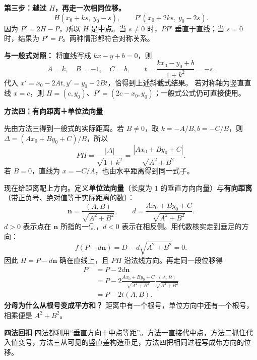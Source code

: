 \begin{proofbox}
\textbf{第三步：越过 $H$，再走一次相同位移。}
\[
 \boxed{H(x_0+ks,\ y_0-s)},\qquad
 \boxed{P'(x_0+2ks,\ y_0-2s)}.
\]
因为 $P'=2H-P$，所以 $H$ 是中点。当 $s\ne0$ 时，$PP'$ 垂直于直线；当 $s=0$ 时，结果为 $P'=P$。两种情形都符合对称关系。

\textbf{与一般式对照：} 将直线写成 $kx-y+b=0$，则
\[
 A=k,\quad B=-1,\quad C=b,\qquad
 t=\frac{kx_0-y_0+b}{1+k^2}=-s.
\]
代入 $x'=x_0-2At,y'=y_0-2Bt$，恰得到上述斜截式结果。
若对称轴为竖直直线 $x=c$，则 $H=(c,y_0)$、$P'=(2c-x_0,y_0)$；一般式公式仍可直接使用。

\medskip
\begin{minipage}{\linewidth}
\textbf{\textcolor{CProof}{方法四：有向距离＋单位法向量}}

\end{minipage}

先由方法三得到一般式的实际距离。若 $B\ne0$，取
$k=-A/B,b=-C/B$，则 $\Delta=(Ax_0+By_0+C)/B$，所以
\[
 PH=\frac{|\Delta|}{\sqrt{1+k^2}}
 =\frac{|Ax_0+By_0+C|}{\sqrt{A^2+B^2}}.
\]
若 $B=0$，直线为 $x=-C/A$，也由水平距离得到同一式子。

现在给距离配上方向。定义\textbf{单位法向量}（长度为 $1$ 的垂直方向向量）与\textbf{有向距离}（带正负号、绝对值等于实际距离的数）：
\[
 \mathbf n=\frac{(A,B)}{\sqrt{A^2+B^2}},
 \qquad d=\frac{Ax_0+By_0+C}{\sqrt{A^2+B^2}}.
\]
$d>0$ 表示点在 $\mathbf n$ 所指的一侧，$d<0$ 表示在相反侧。用代数核实走到垂足的方向：
\[
 f(P-d\mathbf n)
 =D-d\sqrt{A^2+B^2}=0.
\]
因此 $H=P-d\mathbf n$ 确在直线上，且 $PH$ 沿法线方向。再走同一段位移得
\[
 \begin{aligned}
 P'&=P-2d\mathbf n\\
 &=P-2\frac{Ax_0+By_0+C}{\sqrt{A^2+B^2}}
       \frac{(A,B)}{\sqrt{A^2+B^2}}\\
 &=P-2t(A,B).
 \end{aligned}
\]
\textbf{分母为什么从根号变成平方和？} 距离中有一个根号，单位方向中还有一个根号，相乘便是 $A^2+B^2$。

\medskip
\textbf{\textcolor{CProof}{四法回扣}}
四法都利用“垂直方向＋中点等距”。方法一直接代中点，方法二抓住代入值变号，方法三从可见的竖直差构造垂足，方法四把相同过程写成带方向的位移。
\end{proofbox}
